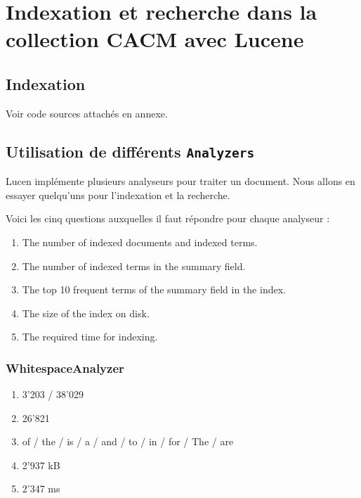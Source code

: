 \chapter{Indexation et recherche dans la collection CACM avec Lucene}

\section{Indexation}

Voir code sources attachés en annexe.

\section{Utilisation de différents \texttt{Analyzers}}

Lucen implémente plusieurs analyseurs pour traiter un document. Nous allons en essayer quelqu'uns pour l'indexation et la recherche.

Voici les cinq questions auxquelles il faut répondre pour chaque analyseur :

\begin{enumerate}
    \item The number of indexed documents and indexed terms.
    \item The number of indexed terms in the summary field.
    \item The top 10 frequent terms of the summary field in the index.
    \item The size of the index on disk.
    \item The required time for indexing.
\end{enumerate}

\subsection{WhitespaceAnalyzer}
\begin{enumerate}
    \item 3'203 / 38'029
    \item 26'821
    \item of / the / is / a / and / to / in / for / The / are
    \item 2'937 kB
    \item 2'347 ms
\end{enumerate}


